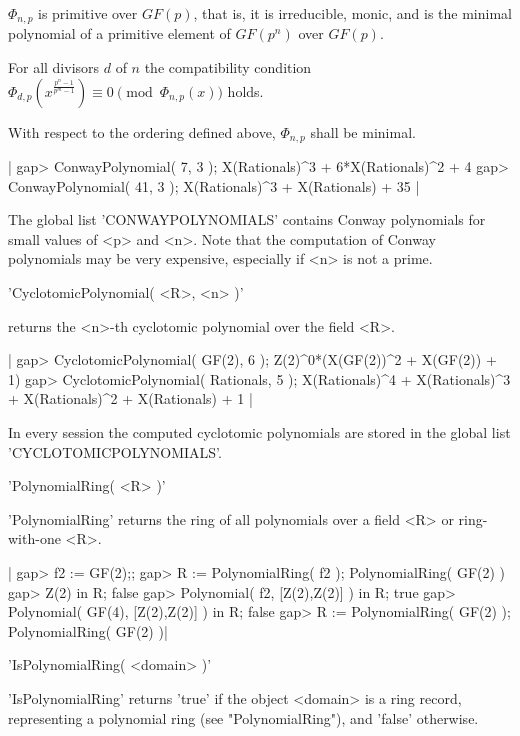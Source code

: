 $\Phi_{n,p}$ is primitive over $GF(p)$, that is, it is irreducible,
monic, and is the minimal polynomial of a primitive element of
$GF(p^n)$ over $GF(p)$.

For all divisors $d$ of $n$ the compatibility condition
$\Phi_{d,p}( x^{\frac{p^n-1}{p^m-1}} ) \equiv 0 \pmod{\Phi_{n,p}(x)}$
holds.

With respect to the ordering defined above, $\Phi_{n,p}$ shall be
minimal.

|    gap> ConwayPolynomial( 7, 3 );
    X(Rationals)^3 + 6*X(Rationals)^2 + 4
    gap> ConwayPolynomial( 41, 3 );
    X(Rationals)^3 + X(Rationals) + 35 |

The global list 'CONWAYPOLYNOMIALS' contains Conway polynomials for small
values of <p> and <n>.
Note that the computation of Conway polynomials may be very expensive,
especially if <n> is not a prime.


'CyclotomicPolynomial( <R>, <n> )'

returns the <n>-th cyclotomic polynomial over the field <R>.

|    gap> CyclotomicPolynomial( GF(2), 6 );
    Z(2)^0*(X(GF(2))^2 + X(GF(2)) + 1)
    gap> CyclotomicPolynomial( Rationals, 5 );
    X(Rationals)^4 + X(Rationals)^3 + X(Rationals)^2 + X(Rationals) + 1 |

In every {\GAP} session the computed cyclotomic polynomials are stored in
the global list 'CYCLOTOMICPOLYNOMIALS'.


'PolynomialRing( <R> )'

'PolynomialRing' returns the ring of all polynomials  over a field <R> or
ring-with-one <R>.

|    gap> f2 := GF(2);;                
    gap> R := PolynomialRing( f2 );
    PolynomialRing( GF(2) )
    gap> Z(2) in R;
    false
    gap> Polynomial( f2, [Z(2),Z(2)] ) in R;
    true
    gap> Polynomial( GF(4), [Z(2),Z(2)] ) in R;
    false
    gap> R := PolynomialRing( GF(2) );
    PolynomialRing( GF(2) )|



'IsPolynomialRing( <domain> )'


'IsPolynomialRing'  returns 'true'  if  the object  <domain>  is  a  ring
record,  representing  a  polynomial  ring  (see  "PolynomialRing"),  and
'false' otherwise.
    
